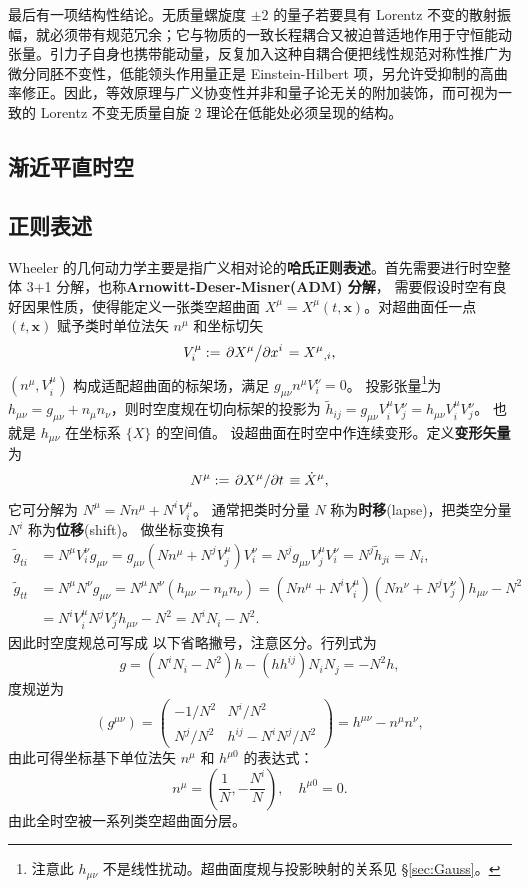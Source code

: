 最后有一项结构性结论。无质量螺旋度 $\pm2$ 的量子若要具有 Lorentz 不变的散射振幅，就必须带有规范冗余；它与物质的一致长程耦合又被迫普适地作用于守恒能动张量。引力子自身也携带能动量，反复加入这种自耦合便把线性规范对称性推广为微分同胚不变性，低能领头作用量正是 Einstein-Hilbert 项，另允许受抑制的高曲率修正。因此，等效原理与广义协变性并非和量子论无关的附加装饰，而可视为一致的 Lorentz 不变无质量自旋 2 理论在低能处必须呈现的结构。


\subsection{渐近平直时空}

\subsection{正则表述}\label{sec:Hamilton}

Wheeler 的几何动力学主要是指广义相对论的\textbf{哈氏正则表述}。首先需要进行时空整体 3+1 分解，也称\textbf{Arnowitt-Deser-Misner(ADM) 分解}，
需要假设时空有良好因果性质，使得能定义一张类空超曲面 $X^{\mu}=X^{\mu}(t,\bm x)$。对超曲面任一点 $(t,\bm x)$ 赋予类时单位法矢 $n^{\mu}$ 和坐标切矢
\[ V_{i}^{\mu} := \pdv*{X^{\mu}}{x^{i}} = {X^{\mu}}_{,i}, \]
$(n^{\mu},V_{i}^{\mu})$ 构成适配超曲面的标架场，满足 $g_{\mu\nu}n^{\mu}V_{i}^{\nu}=0$。
投影张量\footnote{注意此 $h_{\mu\nu}$ 不是线性扰动。超曲面度规与投影映射的关系见 \S\ref{sec:Gauss}。}为 $h_{\mu\nu}=g_{\mu\nu}+n_{\mu}n_{\nu}$，则时空度规在切向标架的投影为 $\tilde h_{ij} = g_{\mu\nu}V_{i}^{\mu}V_{j}^{\nu} = h_{\mu\nu}V_{i}^{\mu}V_{j}^{\nu}$。
也就是 $h_{\mu\nu}$ 在坐标系 $\{X\}$ 的空间值。
设超曲面在时空中作连续变形。定义\textbf{变形矢量}为
\[ N^{\mu} := \pdv*{X^{\mu}}{t} \equiv \dot{X}^{\mu}, \]
它可分解为 $N^{\mu}=Nn^{\mu}+N^{i}V_{i}^{\mu}$。
通常把类时分量 $N$ 称为\textbf{时移}(lapse)，把类空分量 $N^{i}$ 称为\textbf{位移}(shift)。 
做坐标变换有
\begin{align*}
    \tilde g_{ti} &= N^{\mu}V_{i}^{\nu}g_{\mu\nu} = g_{\mu\nu}(Nn^{\mu}+N^{j}V_{j}^{\mu})V_{i}^{\nu} = N^{j}g_{\mu\nu}V_{j}^{\mu}V_{i}^{\nu} = N^{j}\tilde h_{ji} = N_{i},\\
    \tilde g_{tt} &= N^{\mu}N^{\nu}g_{\mu\nu} = N^{\mu}N^{\nu}(h_{\mu\nu}-n_{\mu}n_{\nu}) = (Nn^{\mu}+N^{i}V_{i}^{\mu})(Nn^{\nu}+N^{j}V_{j}^{\nu})h_{\mu\nu}-N^{2} \\
    &= N^{i}V_{i}^{\mu}N^{j}V_{j}^{\nu}h_{\mu\nu}-N^{2} = N^{i}N_{i}-N^{2}.
\end{align*}
因此时空度规总可写成
以下省略撇号，注意区分。行列式为
\[ g = (N^{i}N_{i}-N^{2})h - (hh^{ij})N_{i}N_{j} = -N^{2}h, \]
度规逆为
\[ (g^{\mu\nu}) = \begin{pmatrix} -1/N^{2} & N^{i}/N^{2} \\ N^{j}/N^{2} & h^{ij}-N^{i}N^{j}/N^{2} \end{pmatrix} = h^{\mu\nu}-n^{\mu}n^{\nu} , \]
由此可得坐标基下单位法矢 $n^{\mu}$ 和 $h^{\mu0}$ 的表达式：
\[ n^{\mu} = \left(\frac{1}{N}, -\frac{N^{i}}{N}\right),\quad h^{\mu0} = 0. \]
由此全时空被一系列类空超曲面分层。

